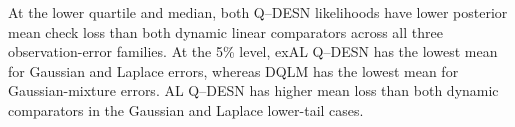 At the lower quartile and median, both Q--DESN likelihoods have lower posterior mean check loss than both dynamic linear comparators across all three observation-error families.
At the 5\% level, exAL Q--DESN has the lowest mean for Gaussian and Laplace errors, whereas DQLM has the lowest mean for Gaussian-mixture errors. AL Q--DESN has higher mean loss than both dynamic comparators in the Gaussian and Laplace lower-tail cases.
